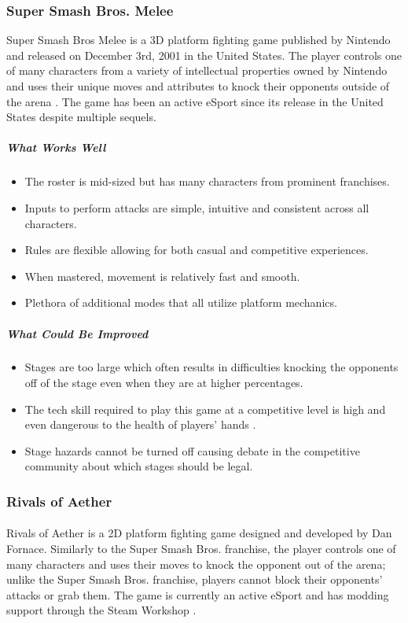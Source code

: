\subsubsection{Super Smash Bros. Melee}

Super Smash Bros Melee is a 3D platform fighting game published by Nintendo and released on December 3rd, 2001 in the United States. The player controls one of many characters from a variety of intellectual properties owned by Nintendo and uses their unique moves and attributes to knock their opponents outside of the arena \autocite{sakurai_super_2001}. The game has been an active eSport since its release in the United States despite multiple sequels.

\subparagraph{What Works Well}

\begin{itemize}
    \item The roster is mid-sized but has many characters from prominent franchises.
    \item Inputs to perform attacks are simple, intuitive and consistent across all characters.
    \item Rules are flexible allowing for both casual and competitive experiences.
    \item When mastered, movement is relatively fast and smooth.
    \item Plethora of additional modes that all utilize platform mechanics.
\end{itemize}

\subparagraph{What Could Be Improved}

\begin{itemize}
    \item Stages are too large which often results in difficulties knocking the opponents off of the stage even when they are at higher percentages.
    \item The tech skill required to play this game at a competitive level is high and even dangerous to the health of players' hands \autocite{lee_haxs_2016}.
    \item Stage hazards cannot be turned off causing debate in the competitive community about which stages should be legal.
\end{itemize}

\subsubsection{Rivals of Aether}

\paragraph{} Rivals of Aether is a 2D platform fighting game designed and developed by Dan Fornace. Similarly to the Super Smash Bros. franchise, the player controls one of many characters and uses their moves to knock the opponent out of the arena; unlike the Super Smash Bros. franchise, players cannot block their opponents' attacks or grab them. The game is currently an active eSport and has modding support through the Steam Workshop \autocite{fornace_rivals_2017}.

